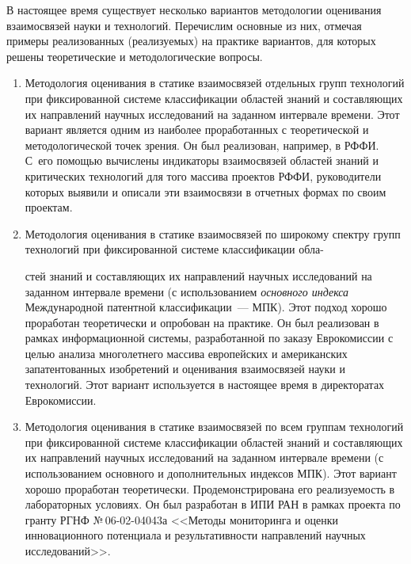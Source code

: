 \begin{multicols}{2}
    В настоящее время существует несколько вариантов методологии оценивания 
взаимосвязей науки и технологий. Перечислим основные из них, отмечая примеры 
реализованных (реализуемых) на практике вариантов, для которых решены теоретические и 
методологические вопросы.
    \begin{enumerate}[1.]
  \item Методология оценивания в статике взаимосвязей отдельных групп технологий при 
фиксированной системе классификации областей знаний и составляющих их направлений 
научных исследований на заданном интервале времени. Этот вариант является одним из 
наиболее проработанных с теоретической и методологической точек зрения. Он был 
реализован, например, в РФФИ. С~его помощью вычислены индикаторы взаимосвязей 
областей знаний и критических технологий для того массива проектов РФФИ, руководители 
которых выявили и описали эти взаимосвязи в отчетных формах по своим проектам.
  \item Методология оценивания в статике взаимосвязей по широкому спектру групп 
технологий при фиксированной системе классификации обла-\linebreak\vspace*{-12pt}

\pagebreak

\noindent
стей знаний и составляющих их 
направлений научных исследований на заданном интервале времени (с использованием 
\textit{основного индекса} Международной патентной классификации~--- МПК). Этот подход 
хорошо проработан теоретически и опробован на практике. Он был реализован в рамках 
информационной системы, разработанной по заказу Еврокомиссии с целью анализа 
многолетнего массива европейских и американских запатентованных изобретений и 
оценивания взаимосвязей науки и технологий. Этот вариант используется в настоящее время в 
директоратах Еврокомиссии.
  \item Методология оценивания в статике взаимосвязей по всем группам технологий при 
фиксированной системе классификации областей знаний и составляющих их направлений 
научных исследований на заданном интервале времени (с использованием основного и 
дополнительных индексов МПК). Этот вариант хорошо проработан теоретически. 
Продемонстрирована его реализуемость в лабораторных условиях. Он был разработан в ИПИ 
РАН в рамках проекта по гранту РГНФ №\,06-02-04043а <<Методы мониторинга и оценки 
инновационного потенциала и результативности направлений научных исследований>>.
  \end{enumerate}
  

\end{multicols}
